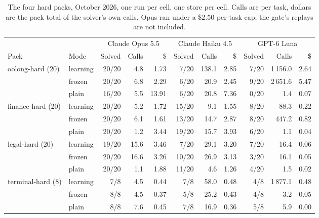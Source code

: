 \documentclass[11pt,a4paper]{article}
\begin{document}
\begin{table}[htbp]
\centering
\footnotesize
\setlength{\tabcolsep}{3.5pt}
\begin{tabular}{@{}ll rrr rrr rrr@{}}
\toprule
& & \multicolumn{3}{c}{Claude Opus 5.5} & \multicolumn{3}{c}{Claude Haiku 4.5} & \multicolumn{3}{c}{GPT-6 Luna} \\
\cmidrule(lr){3-5} \cmidrule(lr){6-8} \cmidrule(lr){9-11}
Pack & Mode & Solved & Calls & \$ & Solved & Calls & \$ & Solved & Calls & \$ \\
\midrule
oolong-hard (20)   & learning & 20/20 & 4.8  & 1.73  & 7/20  & 138.1 & 2.85 & 7/20 & 1\,156.0 & 2.64 \\
                   & frozen   & 20/20 & 6.8  & 2.29  & 6/20  & 20.9  & 2.45 & 9/20 & 2\,651.6 & 5.47 \\
                   & plain    & 16/20 & 5.5  & 13.91 & 6/20  & 20.8  & 7.36 & 0/20 & 1.4      & 0.07 \\
\addlinespace
finance-hard (20)  & learning & 20/20 & 5.2  & 1.72  & 15/20 & 9.1   & 1.55 & 8/20 & 88.3     & 0.22 \\
                   & frozen   & 20/20 & 6.1  & 1.61  & 13/20 & 14.7  & 2.87 & 8/20 & 447.2    & 0.82 \\
                   & plain    & 20/20 & 1.2  & 3.44  & 19/20 & 15.7  & 3.93 & 6/20 & 1.1      & 0.04 \\
\addlinespace
legal-hard (20)    & learning & 19/20 & 15.6 & 3.46  & 7/20  & 29.1  & 3.20 & 7/20 & 16.4     & 0.06 \\
                   & frozen   & 20/20 & 16.6 & 3.26  & 10/20 & 26.9  & 3.13 & 3/20 & 16.1     & 0.05 \\
                   & plain    & 20/20 & 1.1  & 1.88  & 11/20 & 4.6   & 1.26 & 4/20 & 1.5      & 0.02 \\
\addlinespace
terminal-hard (8)  & learning & 7/8   & 4.5  & 0.44  & 7/8   & 58.0  & 0.48 & 4/8  & 1\,877.1 & 0.48 \\
                   & frozen   & 8/8   & 4.5  & 0.37  & 5/8   & 25.2  & 0.43 & 4/8  & 3.2      & 0.05 \\
                   & plain    & 8/8   & 7.6  & 0.45  & 7/8   & 16.9  & 0.36 & 5/8  & 5.9      & 0.00 \\
\bottomrule
\end{tabular}
\caption{The four hard packs, October 2026, one run per cell, one store per
cell. Calls are per task, dollars are the pack total of the solver's own
calls. Opus ran under a \$2.50 per-task cap; the gate's replays are not
included.}
\label{tab:hard}
\end{table}
\end{document}
